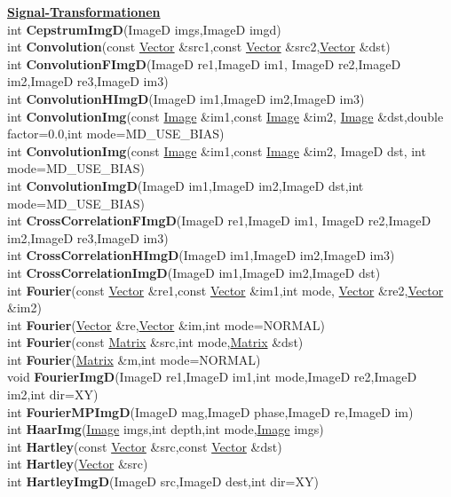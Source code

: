 \documentclass[10pt,titlepage]{article}
\newcommand{\subtitle}[1]{{\noindent\bf#1}}
\def\functionlistentry#1#2#3#4#5#6{\noindent #1 {\bf #2}(#3) \dotfill #6\\}
\begin{document}
{{\subtitle{\hyperlink{SECTION:signalTrafo}{Signal-Transformationen}}\\
\functionlistentry{int}{CepstrumImgD}{ImageD imgs,ImageD imgd}{1210}{signalTrafo}{}
\functionlistentry{int}{Convolution}{const \hyperlink{Vector}{Vector} \&src1,const \hyperlink{Vector}{Vector} \&src2,\hyperlink{Vector}{Vector} \&dst}{1211}{signalTrafo}{}
\functionlistentry{int}{ConvolutionFImgD}{ImageD re1,ImageD im1, ImageD re2,ImageD im2,ImageD re3,ImageD im3}{1213}{signalTrafo}{}
\functionlistentry{int}{ConvolutionHImgD}{ImageD im1,ImageD im2,ImageD im3}{1214}{signalTrafo}{}
\functionlistentry{int}{ConvolutionImg}{const \hyperlink{Image}{Image} \&im1,const \hyperlink{Image}{Image} \&im2, \hyperlink{Image}{Image} \&dst,double factor=0.0,int mode=MD\_USE\_BIAS}{1215}{signalTrafo}{}
\functionlistentry{int}{ConvolutionImg}{const \hyperlink{Image}{Image} \&im1,const \hyperlink{Image}{Image} \&im2, ImageD dst, int mode=MD\_USE\_BIAS}{1216}{signalTrafo}{}
\functionlistentry{int}{ConvolutionImgD}{ImageD im1,ImageD im2,ImageD dst,int mode=MD\_USE\_BIAS}{1212}{signalTrafo}{}
\functionlistentry{int}{CrossCorrelationFImgD}{ImageD re1,ImageD im1, ImageD re2,ImageD im2,ImageD re3,ImageD im3}{1224}{signalTrafo}{}
\functionlistentry{int}{CrossCorrelationHImgD}{ImageD im1,ImageD im2,ImageD im3}{1225}{signalTrafo}{}
\functionlistentry{int}{CrossCorrelationImgD}{ImageD im1,ImageD im2,ImageD dst}{1223}{signalTrafo}{}
\functionlistentry{int}{Fourier}{const \hyperlink{Vector}{Vector} \&re1,const \hyperlink{Vector}{Vector} \&im1,int mode, \hyperlink{Vector}{Vector} \&re2,\hyperlink{Vector}{Vector} \&im2}{1194}{signalTrafo}{}
\functionlistentry{int}{Fourier}{\hyperlink{Vector}{Vector} \&re,\hyperlink{Vector}{Vector} \&im,int mode=NORMAL}{1195}{signalTrafo}{}
\functionlistentry{int}{Fourier}{const \hyperlink{Matrix}{Matrix} \&src,int mode,\hyperlink{Matrix}{Matrix} \&dst}{1196}{signalTrafo}{}
\functionlistentry{int}{Fourier}{\hyperlink{Matrix}{Matrix} \&m,int mode=NORMAL}{1197}{signalTrafo}{}
\functionlistentry{void}{FourierImgD}{ImageD re1,ImageD im1,int mode,ImageD re2,ImageD im2,int dir=XY}{1200}{signalTrafo}{}
\functionlistentry{int}{FourierMPImgD}{ImageD mag,ImageD phase,ImageD re,ImageD im}{1208}{signalTrafo}{}
\functionlistentry{int}{HaarImg}{\hyperlink{Image}{Image} imgs,int depth,int mode,\hyperlink{Image}{Image} imgs}{1229}{signalTrafo}{}
\functionlistentry{int}{Hartley}{const \hyperlink{Vector}{Vector} \&src,const \hyperlink{Vector}{Vector} \&dst}{1198}{signalTrafo}{}
\functionlistentry{int}{Hartley}{\hyperlink{Vector}{Vector} \&src}{1199}{signalTrafo}{}
\functionlistentry{int}{HartleyImgD}{ImageD src,ImageD dest,int dir=XY}{1201}{signalTrafo}{}
}}
\end{document}
